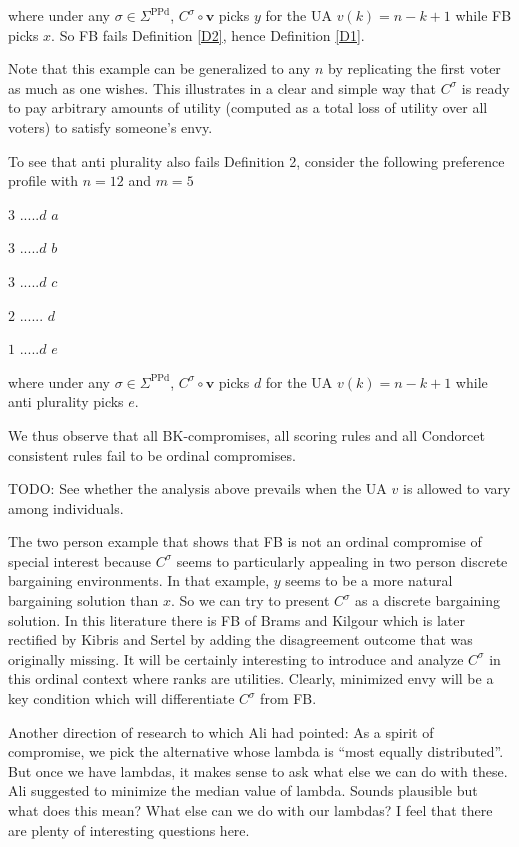 \documentclass[version=3.21, pagesize, notitlepage, twoside=off, bibliography=totoc, DIV=calc, fontsize=12pt, a4paper]{scrartcl}
\newcommand{\SPPd}{\Sigma^\text{PPd}}
\newcommand{\vpr}{\mathbf{v}}
\begin{document}
where under any $\sigma \in \SPPd $, $C^{\sigma }\circ \vpr$ picks $y$ for the UA $v(k)=n-k+1$ while FB picks $x$. So FB fails Definition \ref{D2}, hence Definition \ref{D1}.

Note that this example can be generalized to any $n$ by replicating the first voter as much as one wishes. This illustrates in a clear and simple
way that $C^{\sigma }$ is ready to pay arbitrary amounts of utility (computed as a total loss of utility over all voters) to satisfy someone's envy.

To see that anti plurality also fails Definition 2, consider the following preference profile with $n=12$ and $m=5$

$3$ $.....d$ $a$

$3$ $.....d$ $b$

$3$ $.....d$ $c$

$2$ $......$ $d$

$1$ $.....d$ $e$

\bigskip

where under any $\sigma \in \SPPd $, $C^{\sigma }\circ \vpr$ picks $d$ for the UA $v(k)=n-k+1$ while anti plurality picks $e$.

We thus observe that all BK-compromises, all scoring rules and all Condorcet consistent rules fail to be ordinal compromises.

TODO: See whether the analysis above prevails when the UA $v$ is allowed to vary among individuals.

The two person example that shows that FB is not an ordinal compromise of special interest because $C^{\sigma }$ seems to particularly appealing in two person discrete bargaining environments. In that example, $y$ seems to be a more natural bargaining solution than $x$. So we can try to present $C^{\sigma }$ as a discrete bargaining solution. In this literature there is FB of Brams and Kilgour which is later rectified by Kibris and Sertel \cite{Sertel1999} by adding the disagreement outcome that was originally missing. It will be certainly interesting to introduce and analyze $C^{\sigma }$ in this ordinal context where ranks are utilities. Clearly, minimized envy will be a key condition which will differentiate $C^{\sigma }$ from FB.

Another direction of research to which Ali had pointed: As a spirit of compromise, we pick the alternative whose lambda is “most equally distributed”. But once we have lambdas, it makes sense to ask what else we can do with these. Ali suggested to minimize the median value of lambda. Sounds plausible but what does this mean? What else can we do with our lambdas? I feel that there are plenty of interesting questions here.
\end{document}
